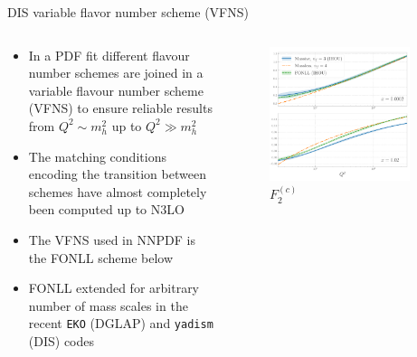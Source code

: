 \documentclass[8pt,t]{beamer}
\begin{document}
\begin{frame}{DIS variable flavor number scheme (VFNS)}
  \begin{columns}
    \begin{column}{0.59\textwidth}
      \begin{itemize}
        \item In a PDF fit different flavour number schemes are joined in a variable flavour number scheme (VFNS) to ensure reliable results from $Q^2\sim m_h^2$ up to $Q^2\gg m_h^2$
        \item The matching conditions encoding the transition between schemes have almost completely been computed up to N3LO
        \item The VFNS used in NNPDF is the FONLL scheme below
        \item FONLL extended for arbitrary number of mass scales in the recent \texttt{EKO} (DGLAP) and \texttt{yadism} (DIS) codes
      \end{itemize}
    \end{column}
    \begin{column}{0.39\textwidth}
      \vspace*{-2em}
      \begin{figure}[!t]
        \centering
        \includegraphics[width=0.89\textwidth]{figures/F2_charm_n3lo.pdf}
        \caption*{$F_2^{(c)}$}
      \end{figure}
    \end{column}
  \end{columns}


\end{frame}
\end{document}
